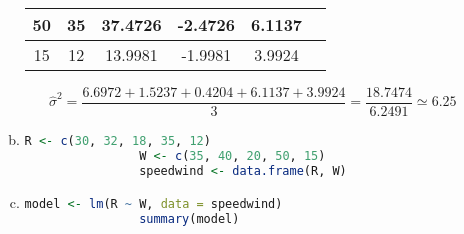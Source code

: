 \documentclass[12pt]{article}
\begin{document}
\begin{enumerate}[1.]
\begin{enumerate}[(a)]
\begin{center}
\begin{tabular}{|c|c|c|c|c|c|}
                    50 & 35 & 37.4726 & -2.4726 & 6.1137 \\
                    \hline
                    15 & 12 & 13.9981 & -1.9981 & 3.9924 \\
                    \hline
                \end{tabular}
                \[ \hat{\sigma}^2 = \frac{6.6972 + 1.5237 + 0.4204 + 6.1137 + 3.9924}{3} = \frac{18.7474}{6.2491} \simeq 6.25 \]
            \end{center}
            \item
            \begin{lstlisting}[language=R]
                R <- c(30, 32, 18, 35, 12)
                W <- c(35, 40, 20, 50, 15)
                speedwind <- data.frame(R, W)
            \end{lstlisting}
            \item 
            \begin{lstlisting}[language=R]
                model <- lm(R ~ W, data = speedwind)
                summary(model)
            \end{lstlisting}
            
        \end{enumerate}
\end{enumerate}
\end{document}
